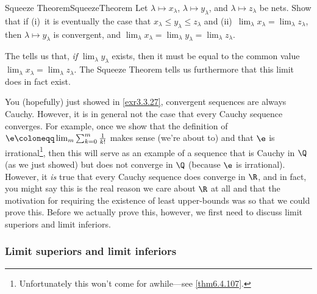 \begin{exr}{Squeeze Theorem}{SqueezeTheorem}
Let $\lambda \mapsto x_{\lambda}$, $\lambda \mapsto y_{\lambda}$, and $\lambda \mapsto z_{\lambda}$ be nets.  Show that if (i)~it is eventually the case that $x_{\lambda}\leq y_{\lambda}\leq z_{\lambda}$ and (ii)~$\lim _{\lambda}x_{\lambda}=\lim _{\lambda}z_{\lambda}$, then $\lambda \mapsto y_{\lambda}$ is convergent, and $\lim _{\lambda}x_{\lambda}=\lim _{\lambda}y_{\lambda}=\lim _{\lambda}z_{\lambda}$.
\begin{rmk}
The  tells us that, \emph{if} $\lim _{\lambda}y_{\lambda}$ exists, then it must be equal to the common value $\lim _{\lambda}x_{\lambda}=\lim _{\lambda}z_{\lambda}$.  The Squeeze Theorem tells us furthermore that this limit does in fact exist.
\end{rmk}
\end{exr}

\horizontalrule

You (hopefully) just showed in \cref{exr3.3.27}, convergent sequences are always Cauchy.  However, it is in general not the case that every Cauchy sequence converges.  For example, once we show that the definition of $\e \coloneqq \lim _m\sum _{k=0}^m\frac{1}{k!}$ makes sense (we're about to) and that $\e$ is irrational\footnote{Unfortunately this won't come for awhile---see \cref{thm6.4.107}.}, then this will serve as an example of a sequence that is Cauchy in $\Q$ (as we just showed) but does not converge in $\Q$ (because $\e$ is irrational).  However, it \emph{is} true that every Cauchy sequence does converge in $\R$, and in fact, you might say this is the real reason we care about $\R$ at all and that the motivation for requiring the existence of least upper-bounds was so that we could prove this.  Before we actually prove this, however, we first need to discuss limit superiors and limit inferiors.

\subsubsection{Limit superiors and limit inferiors}

